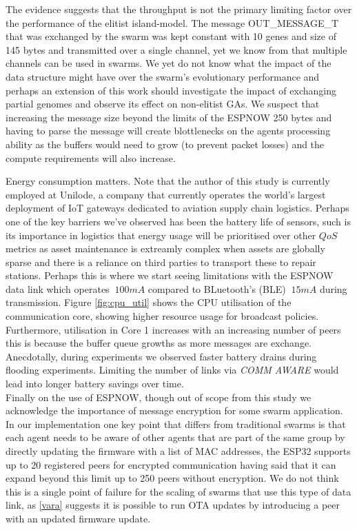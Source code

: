 \documentclass[conference]{IEEEtran}
\begin{document}
The evidence suggests that the throughput is not the primary limiting factor over the performance of the elitist island-model. The message OUT\_MESSAGE\_T that was exchanged by the swarm was kept constant with 10 genes and size of 145 bytes and transmitted over a single channel, yet we know from \cite{hauert_evolved_2009} that multiple channels can be used in swarms. We yet do not know what the impact of the data structure might have over the swarm's evolutionary performance and perhaps an extension of this work should investigate the impact of exchanging partial genomes and observe its effect on non-elitist GAs. We suspect that increasing the message size beyond the limits of the ESPNOW 250 bytes and having to parse the message will create blottlenecks on the agents processing ability as the buffers would need to grow (to prevent packet losses) and the compute requirements will also increase. 

Energy consumption matters. Note that the author of this study is currently employed at Unilode, a company that currently operates the world's largest deployment of IoT gateways dedicated to aviation supply chain logistics. Perhaps one of the key barriers we've observed has been the battery life of sensors, such is its importance in logistics that energy usage will be prioritised over other $QoS$ metrics as asset maintenance is extreamly complex when assets are globally sparse and there is a reliance on third parties to transport these to repair stations. Perhaps this is where we start seeing limitations with the ESPNOW data link which operates $~100mA$ compared to BLuetooth's (BLE) $~15mA$ during transmission. Figure \ref{fig:cpu_util} shows the CPU utilisation of the communication core, showing higher resource usage for broadcast policies. Furthermore, utilisation in Core 1 increases with an increasing number of peers this is because the buffer queue growths as more messages are exchange. Anecdotally, during experiments we observed faster battery drains during flooding experiments. Limiting the number of links via \emph{COMM AWARE} would lead into longer battery savings over time.\\
Finally on the use of ESPNOW, though out of scope from this study we acknowledge the importance of message encryption for some swarm application. In our implementation one key point that differs from traditional swarms is that each agent needs to be aware of other agents that are part of the same group by directly updating the firmware with a list of MAC addresses, the ESP32 supports up to 20 registered peers for encrypted communication having said that it can expand beyond this limit up to 250 peers without encryption. We do not think this is a single point of failure for the scaling of swarms that use this type of data link, as \ref{vara} suggests it is possible to run OTA updates by introducing a peer with an updated firmware update.
\end{document}
